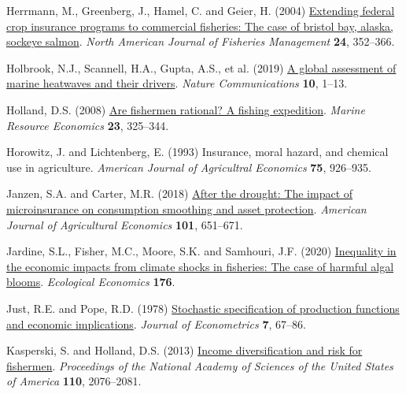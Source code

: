 \documentclass[
  letterpaper,
  DIV=11,
  numbers=noendperiod]{scrartcl}
\newlength{\cslhangindent}
\newlength{\cslentryspacingunit} %
\newenvironment{CSLReferences}[2] %
 {%
  \setlength{\parindent}{0pt}
  \ifodd #1
  \let\oldpar\par
  \def\par{\hangindent=\cslhangindent\oldpar}
  \fi
  \setlength{\parskip}{#2\cslentryspacingunit}
 }%
 {}
\theoremstyle{plain}
\theoremstyle{plain}
\theoremstyle{remark}
\begin{document}
\begin{CSLReferences}{1}{0}
\leavevmode{}%
Herrmann, M., Greenberg, J., Hamel, C. and Geier, H. (2004)
\href{https://doi.org/10.1577/M02-086.1}{Extending federal crop
insurance programs to commercial fisheries: The case of bristol bay,
alaska, sockeye salmon}. \emph{North American Journal of Fisheries
Management} \textbf{24}, 352--366.

\leavevmode{}%
Holbrook, N.J., Scannell, H.A., Gupta, A.S., et al. (2019)
\href{https://doi.org/10.1038/s41467-019-10206-z}{A global assessment of
marine heatwaves and their drivers}. \emph{Nature Communications}
\textbf{10}, 1--13.

\leavevmode{}%
Holland, D.S. (2008)
\href{https://doi.org/10.1086/mre.23.3.42629621}{Are fishermen rational?
A fishing expedition}. \emph{Marine Resource Economics} \textbf{23},
325--344.

\leavevmode{}%
Horowitz, J. and Lichtenberg, E. (1993) Insurance, moral hazard, and
chemical use in agriculture. \emph{American Journal of Agricultral
Economics} \textbf{75}, 926--935.

\leavevmode{}%
Janzen, S.A. and Carter, M.R. (2018)
\href{https://doi.org/10.1093/ajae/aay061}{After the drought: The impact
of microinsurance on consumption smoothing and asset protection}.
\emph{American Journal of Agricultural Economics} \textbf{101},
651--671.

\leavevmode{}%
Jardine, S.L., Fisher, M.C., Moore, S.K. and Samhouri, J.F. (2020)
\href{https://doi.org/10.1016/j.ecolecon.2020.106691}{Inequality in the
economic impacts from climate shocks in fisheries: The case of harmful
algal blooms}. \emph{Ecological Economics} \textbf{176}.

\leavevmode{}%
Just, R.E. and Pope, R.D. (1978)
\href{https://doi.org/10.1016/0304-4076(78)90006-4}{Stochastic
specification of production functions and economic implications}.
\emph{Journal of Econometrics} \textbf{7}, 67--86.

\leavevmode{}%
Kasperski, S. and Holland, D.S. (2013)
\href{https://doi.org/10.1073/pnas.1212278110}{Income diversification
and risk for fishermen}. \emph{Proceedings of the National Academy of
Sciences of the United States of America} \textbf{110}, 2076--2081.


\end{CSLReferences}
\end{document}
